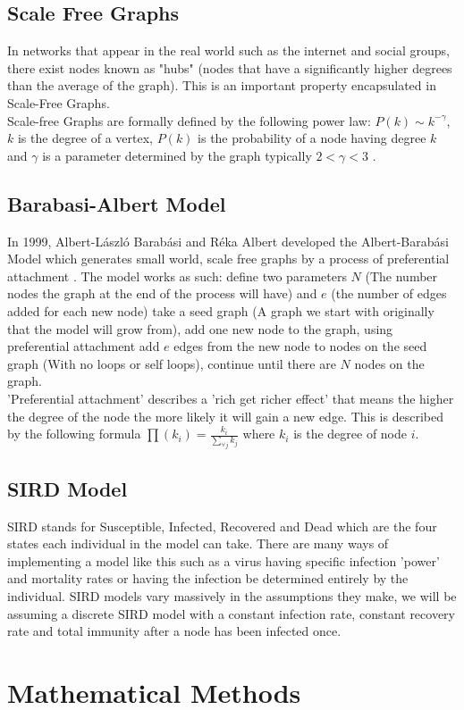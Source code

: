 \documentclass{article}
\begin{document}
        \subsection{Scale Free Graphs}
        In networks that appear in the real world such as the internet and social groups, there exist nodes known as "hubs"  (nodes that have a significantly higher degrees than the average of the graph). This is an important property encapsulated in Scale-Free Graphs.\\ 
        Scale-free Graphs are formally defined by the following power law: $P(k) \sim  k^{-\gamma }$, $k$ is the degree of a vertex, $P(k)$ is the probability of a node having degree $k$ and $\gamma$ is a parameter determined by the graph typically $2<\gamma<3$ \parencite{onnela2007structure}.

        \subsection{Barabasi-Albert Model}
        In 1999, Albert-László Barabási and Réka Albert developed the Albert-Barabási Model which generates small world, scale free graphs by a process of preferential attachment \parencite{barabasi1999emergence}. The model works as such: define two parameters $N$ (The number nodes the graph at the end of the process will have) and $e$ (the number of edges added for each new node) take a seed graph (A graph we start with originally that the model will grow from), add one new node to the graph, using preferential attachment add $e$ edges from the new node to nodes on the seed graph (With no loops or self loops), continue until there are $N$ nodes on the graph.\\
        'Preferential attachment' describes a 'rich get richer effect' that means the higher the degree of the node the more likely it will gain a new edge. This is described by the following formula $\prod (k_{i}) = \frac{k_{i}}{\sum_{\forall j} {k_{j}}}$ where $k_{i}$ is the degree of node $i$. 
        \subsection{SIRD Model}
        SIRD stands for Susceptible, Infected, Recovered and Dead which are the four states each individual in the model can take. There are many ways of implementing a model like this such as a virus having specific infection 'power' and mortality rates or having the infection be determined entirely by the individual. SIRD models vary massively in the assumptions they make, we will be assuming a discrete SIRD model with a constant infection rate, constant recovery rate and total immunity after a node has been infected once.    \section{Mathematical Methods}
\end{document}
